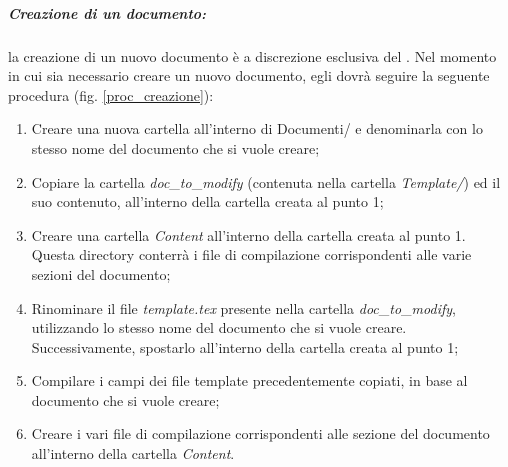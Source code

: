 \subparagraph{Creazione di un documento:}
la creazione di un nuovo documento è a discrezione esclusiva del \projectManager. Nel momento in cui sia necessario creare un nuovo documento, egli dovrà seguire la seguente procedura (fig. \ref{proc_creazione}):
\begin{enumerate}
\item Creare una nuova cartella all'interno di Documenti/ e denominarla con lo stesso nome del documento che si vuole creare;
\item Copiare la cartella \textit{doc}\_\textit{to}\_\textit{modify} (contenuta nella cartella \textit{Template/}) ed il suo contenuto, all'interno della cartella creata al punto 1;
\item Creare una cartella \textit{Content} all'interno della cartella creata al punto 1. Questa directory conterrà i file di compilazione corrispondenti alle varie sezioni del documento;
\item Rinominare il file \textit{template.tex} presente nella cartella \textit{doc}\_\textit{to}\_\textit{modify}, utilizzando lo stesso nome del documento che si vuole creare. Successivamente, spostarlo all'interno della cartella creata al punto 1;
\item Compilare i campi dei file template precedentemente copiati, in base al documento che si vuole creare;
\item Creare i vari file di compilazione corrispondenti alle sezione del documento all'interno della cartella \textit{Content}.
\end{enumerate}
